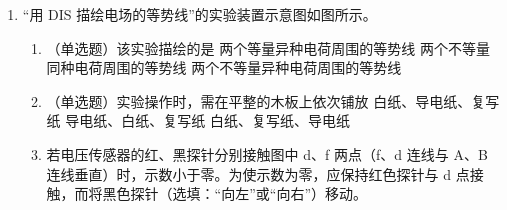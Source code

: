 \documentclass[\gkver]{gaokaozhenti}
\begin{document}
\begin{enumerate}
\item
“用 DIS 描绘电场的等势线”的实验装置示意图如图所示。
\begin{enumerate}
	\item
	（单选题）该实验描绘的是
	{两个等量异种电荷周围的等势线}
	{两个不等量同种电荷周围的等势线}
	{两个不等量异种电荷周围的等势线}
	\item
	（单选题）实验操作时，需在平整的木板上依次铺放
	{白纸、导电纸、复写纸}
	{导电纸、白纸、复写纸}
	{白纸、复写纸、导电纸}
	\item
	若电压传感器的红、黑探针分别接触图中 d、f 两点（f、d 连线与 A、B 连线垂直）时，示数小于零。为使示数为零，应保持红色探针与 d 点接触，而将黑色探针（选填：“向左”或“向右”）移动。
\end{enumerate}
\onepicture[align=right, w=3.28cm]{}


\end{enumerate}
\end{document}
